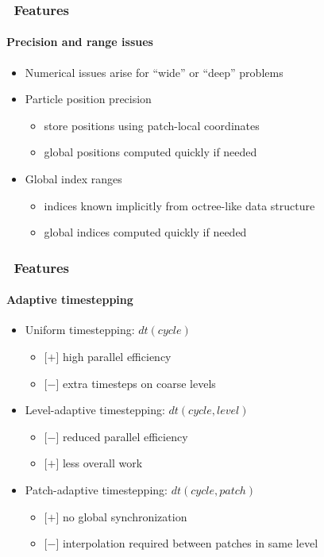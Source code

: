 \begin{frame}[fragile] 
\frametitle{\cello\ Features}
\framesubtitle{Precision and range issues}
\begin{itemize}
\item{} Numerical issues arise for ``wide'' or ``deep'' problems
\item{} Particle position precision
\begin{itemize}
\item{} store positions using patch-local coordinates
\item{} global positions computed quickly if needed
\end{itemize}
\item{} Global index ranges
\begin{itemize}
\item{} indices known implicitly from octree-like data structure
\item{} global indices computed quickly if needed
\end{itemize}
\end{itemize}
\end{frame}

\begin{frame}[fragile] 
\frametitle{\cello\ Features}
\framesubtitle{Adaptive timestepping}
\begin{itemize}
\item{} Uniform timestepping: $dt(cycle)$
\begin{itemize}
\item{}[$+$] high parallel efficiency
\item{}[$-$] extra timesteps on coarse levels
\end{itemize}
\item{} Level-adaptive timestepping: $dt(cycle,level)$
\begin{itemize}
\item{} [$-$]  reduced parallel efficiency 
\item{} [$+$]  less overall work
\end{itemize}
\item{} Patch-adaptive timestepping: $dt(cycle,patch)$
\begin{itemize}
\item{} [$+$] no global synchronization
\item{} [$-$]  interpolation required between patches in same level
\end{itemize}
\end{itemize}
\end{frame}

